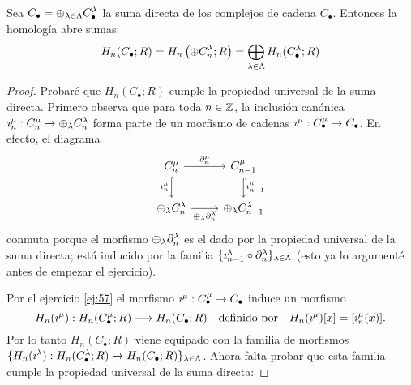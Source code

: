 \begin{ejercicio}\label{ej:63}
  Sea $C_{\bullet}=\oplus_{\lambda\in\Lambda}C_{\bullet}^{\lambda}$ la suma directa de los complejos de cadena
  $C_{\bullet}$. Entonces la homolog\'ia abre sumas:
  \[
    H_n(C_{\bullet};R)=H_n\left( \oplus C_n^{\lambda};R \right)=\bigoplus_{\lambda\in\Lambda}H_n(C_{\bullet}^{\lambda};R)
  \]
\end{ejercicio}
\begin{proof}%
  Probar\'e que $H_n(C_{\bullet};R)$ cumple la propiedad universal de la suma directa. Primero observa
  que para toda $n\in\mathbb{Z}$, la inclusi\'on can\'onica $\imath_n^{\mu}:C_n^{\mu}\rightarrow\oplus_{\lambda}C_n^{\lambda}$ forma
  parte de un morfismo de cadenas $\imath^{\mu}:C_{\bullet}^{\mu}\rightarrow C_{\bullet}$. En efecto,
  el diagrama
  \[
    \begin{tikzcd}
      C_n^{\mu} \arrow[r,"\partial_n^{\mu}"] \arrow[d,hookrightarrow,"\imath_n^{\mu}"'] & C_{n-1}^{\mu}%
      \arrow[d,hookrightarrow,"\imath_{n-1}^{\mu}"]\\
      \oplus_{\la} C_n^{\la} \arrow[r,"\oplus_{\la}\partial_n^{\la}"'] & \oplus_{\la}C_{n-1}^{\la}
    \end{tikzcd}
  \]
  conmuta porque el morfismo $\oplus_{\lambda}\partial_n^{\lambda}$ es el dado por la propiedad universal de la
  suma directa; est\'a inducido por la familia $\{\imath_{n-1}^{\lambda}\circ\partial_n^{\lambda}\}_{\lambda\in\Lambda}$ (esto ya lo
  argument\'e antes de empezar el ejercicio).

  Por el ejercicio \ref{ej:57} el morfismo $\imath^{\mu}:C_{\bullet}^{\mu}\rightarrow C_{\bullet}$
  induce un morfismo
  \[
    H_n(\imath^{\mu}):H_n(C_{\bullet}^{\mu};R)\longrightarrow H_n(C_{\bullet};R) \quad\text{definido por}\quad
    H_n(\imath^{\mu})[x]=[\imath_n^{\mu}(x)].
  \]
  Por lo tanto $H_n(C_{\bullet};R)$ viene equipado con la familia de morfismos
  $\{H_n(\imath^{\lambda}):H_n(C_{\bullet}^{\lambda};R)\rightarrow H_n(C_{\bullet};R)\}_{\lambda\in\Lambda}$. Ahora falta
  probar que esta familia cumple la propiedad universal de la suma directa:


\end{proof}
